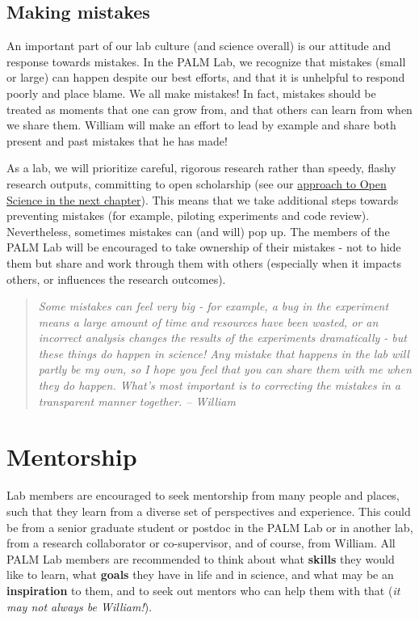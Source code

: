 \documentclass[
]{book}
\begin{document}
\hypertarget{making-mistakes}{%
\subsection*{Making mistakes}\label{making-mistakes}}

An important part of our lab culture (and science overall) is our attitude and response towards mistakes. In the PALM Lab, we recognize that mistakes (small or large) can happen despite our best efforts, and that it is unhelpful to respond poorly and place blame. We all make mistakes! In fact, mistakes should be treated as moments that one can grow from, and that others can learn from when we share them. William will make an effort to lead by example and share both present and past mistakes that he has made!

As a lab, we will prioritize careful, rigorous research rather than speedy, flashy research outputs, committing to open scholarship (see our \protect\hyperlink{open-science}{approach to Open Science in the next chapter}). This means that we take additional steps towards preventing mistakes (for example, piloting experiments and code review). Nevertheless, sometimes mistakes can (and will) pop up. The members of the PALM Lab will be encouraged to take ownership of their mistakes - not to hide them but share and work through them with others (especially when it impacts others, or influences the research outcomes).

\begin{quote}
\emph{Some mistakes can \emph{feel} very big - for example, a bug in the experiment means a large amount of time and resources have been wasted, or an incorrect analysis changes the results of the experiments dramatically - but these things do happen in science! Any mistake that happens in the lab will partly be my own, so I hope you feel that you can share them with me when they do happen. What's most important is to correcting the mistakes in a transparent manner together. -- William}
\end{quote}

\hypertarget{lab-mentorship}{%
\section{Mentorship}\label{lab-mentorship}}

Lab members are encouraged to seek mentorship from many people and places, such that they learn from a diverse set of perspectives and experience. This could be from a senior graduate student or postdoc in the PALM Lab or in another lab, from a research collaborator or co-supervisor, and of course, from William. All PALM Lab members are recommended to think about what \textbf{skills} they would like to learn, what \textbf{goals} they have in life and in science, and what may be an \textbf{inspiration} to them, and to seek out mentors who can help them with that (\emph{it may not always be William!}).
\end{document}
